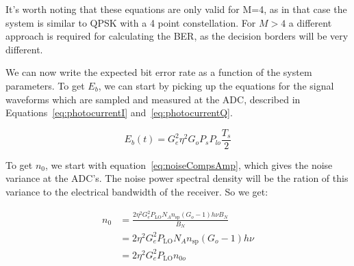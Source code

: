 	It's worth noting that these equations are only valid for M=4, as in that case
	the system is similar to QPSK with a 4 point constellation. For $M > 4$ a
	different approach is required for calculating the BER, as the decision
	borders will be very different.

	We can now write the expected bit error rate as a function of the system
	parameters. To get $E_b$, we can start by picking up the equations for the
	signal waveforms which are sampled and measured at the ADC, described in
	Equations~\ref{eq:photocurrentI} and~\ref{eq:photocurrentQ}.

	\begin{equation}
		E_b(t) = G_e^2 \eta^2 {G_o P_s P_{lo}} \frac{T_s}{2} \label{eq:energyPerBit}
	\end{equation}

	To get $n_0$, we start with equation~\ref{eq:noiseCompsAmp}, which gives the
	noise variance at the ADC's. The noise power spectral density will be the
	ration of this variance to the electrical bandwidth of the receiver. So we
	get:

	\begin{equation}\label{eq:sampledn0}
		\begin{split}
			n_0 &= \frac{2 \eta^2 G_e^2 P_{\text{LO}} N_A n_{\text{sp}} (G_o -
			1)h\nu B_N}{B_N} \\
					&= 2 \eta^2 G_e^2 P_{\text{LO}} N_A n_{\text{sp}} (G_o - 1) h\nu \\
					&= 2 \eta^2 G_e^2 P_{\text{LO}} n_{0o}
		\end{split}
	\end{equation}

\pagebreak